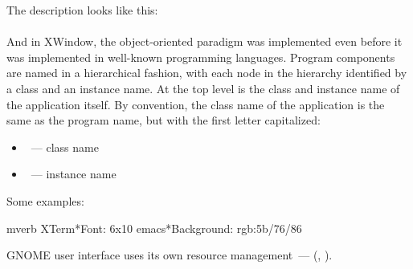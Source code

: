 The description looks like this:\\
\\
And in XWindow, the object-oriented paradigm was implemented even before
it was implemented in well-known programming languages. Program components
are named in a hierarchical fashion, with each node in the hierarchy identified
by a class and an instance name. At the top level is the class and instance name
of the application itself. By convention, the class name of the application is
the same as the program name, but with the first letter capitalized:
\begin{itemize}
\item {}~--- class name
\item {}~--- instance name
\end{itemize}

Some examples:
\begin{code}{mverb}
XTerm*Font:  6x10
emacs*Background:  rgb:5b/76/86
\end{code}

GNOME user interface uses its own resource management~---
 (, ).
